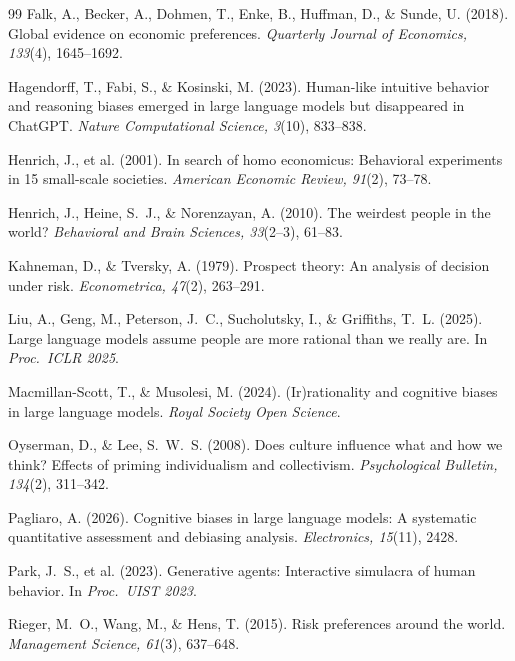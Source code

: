 \documentclass[10pt,letterpaper]{article}
\begin{document}
\begin{thebibliography}{99}
Falk, A., Becker, A., Dohmen, T., Enke, B., Huffman, D., \& Sunde, U. (2018).
Global evidence on economic preferences. \textit{Quarterly Journal of
Economics, 133}(4), 1645--1692.

Hagendorff, T., Fabi, S., \& Kosinski, M. (2023). Human-like intuitive
behavior and reasoning biases emerged in large language models but
disappeared in ChatGPT. \textit{Nature Computational Science, 3}(10),
833--838.

Henrich, J., et al. (2001). In search of homo economicus: Behavioral
experiments in 15 small-scale societies. \textit{American Economic Review,
91}(2), 73--78.

Henrich, J., Heine, S.~J., \& Norenzayan, A. (2010). The weirdest people in
the world? \textit{Behavioral and Brain Sciences, 33}(2--3), 61--83.

Kahneman, D., \& Tversky, A. (1979). Prospect theory: An analysis of decision
under risk. \textit{Econometrica, 47}(2), 263--291.

Liu, A., Geng, M., Peterson, J.~C., Sucholutsky, I., \& Griffiths, T.~L.
(2025). Large language models assume people are more rational than we really
are. In \textit{Proc.\ ICLR 2025}.

Macmillan-Scott, T., \& Musolesi, M. (2024). (Ir)rationality and cognitive
biases in large language models. \textit{Royal Society Open Science}.

Oyserman, D., \& Lee, S.~W.~S. (2008). Does culture influence what and how we
think? Effects of priming individualism and collectivism. \textit{Psychological
Bulletin, 134}(2), 311--342.

Pagliaro, A. (2026). Cognitive biases in large language models: A systematic
quantitative assessment and debiasing analysis. \textit{Electronics, 15}(11),
2428.

Park, J.~S., et al. (2023). Generative agents: Interactive simulacra of human
behavior. In \textit{Proc.\ UIST 2023}.

Rieger, M.~O., Wang, M., \& Hens, T. (2015). Risk preferences around the
world. \textit{Management Science, 61}(3), 637--648.


\end{thebibliography}
\end{document}
